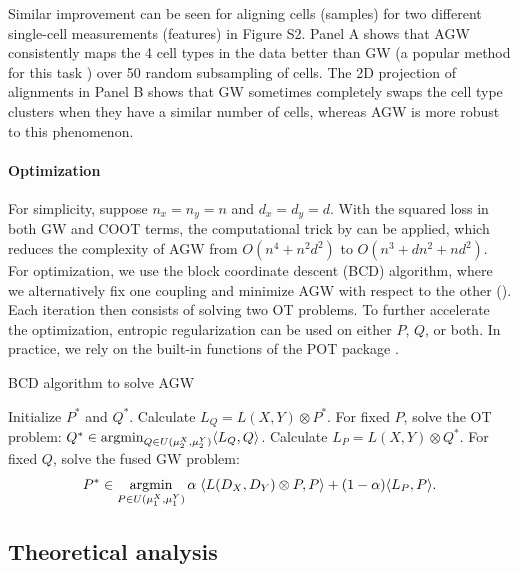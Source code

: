 Similar improvement can be seen for aligning cells (samples) for two different single-cell
measurements (features) \citep{SNAREseq} in Figure S2. Panel A shows that AGW consistently maps
the 4 cell types in the data better than GW (a popular method for this task
\citep{Pamona,Demetci20,Demetci22,UniPort}) over 50 random subsampling of cells.
The 2D projection of alignments in Panel B shows that GW sometimes completely swaps
the cell type clusters when they have a similar number of cells, whereas AGW is more robust
to this phenomenon.

\paragraph{Optimization} For simplicity, suppose $n_x = n_y = n$ and $d_x = d_y = d$.
With the squared loss in both GW and COOT terms, the computational trick by \citep{Peyre16}
can be applied, which reduces the complexity of AGW from $O(n^4 + n^2 d^2)$
to $O(n^3 + dn^2 + nd^2)$. For optimization, we use the block coordinate descent (BCD) algorithm,
where we alternatively fix one coupling and minimize AGW with respect to the other ().
Each iteration then consists of solving two OT problems. To further accelerate the optimization,
entropic regularization can be used \citep{Cuturi13} on either $P$, $Q$, or both.
In practice, we rely on the built-in functions of the POT package \citep{Flamary21}.

\begin{algorithm}[t]
    \caption{BCD algorithm to solve AGW \label{alg:bcd_agw}}
    \begin{algorithmic}[1]
      \STATE Initialize $P^*$ and $Q^*$.
      \REPEAT
      \STATE Calculate $L_Q = L(X, Y) \otimes P^*$.
      \STATE For fixed $P$, solve the OT problem:
      $Q^* \in \operatorname*{argmin}_{Q \in U(\mu_2^X, \mu_2^Y)} \langle L_Q, Q \rangle$.
      \STATE Calculate $L_P = L(X, Y) \otimes Q^*$.
      \STATE For fixed $Q$, solve the fused GW problem:
      \begin{align}
        P^* \in \operatorname*{argmin}_{P \in U(\mu_1^X, \mu_1^Y)}
        \alpha \; \langle L(D_X,D_Y) \otimes P, P \rangle + (1-\alpha) \langle L_P, P \rangle.
      \end{align}
\end{algorithmic}
\end{algorithm}

\subsection{Theoretical analysis} \label{subsec:agw_property}

